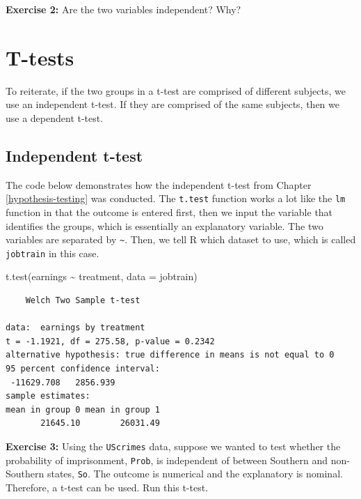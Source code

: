 \documentclass[
]{book}
\makeatletter
\newenvironment{Shaded}{\begin{snugshade}}{\end{snugshade}}
\newcommand{\AttributeTok}[1]{\textcolor[rgb]{0.61,0.61,0.61}{#1}}
\newcommand{\FunctionTok}[1]{\textcolor[rgb]{0,0,0}{#1}}
\newcommand{\NormalTok}[1]{#1}
\newcommand{\SpecialCharTok}[1]{\textcolor[rgb]{0,0,0}{#1}}
\newenvironment{kframe}{%
\medskip{}
\setlength{\fboxsep}{.8em}
 \def\at@end@of@kframe{}%
 \ifinner\ifhmode%
  \def\at@end@of@kframe{\end{minipage}}%
  \begin{minipage}{\columnwidth}%
 \fi\fi%
 \def\FrameCommand##1{\hskip\@totalleftmargin \hskip-\fboxsep
 \colorbox{shadecolor}{##1}\hskip-\fboxsep
     \hskip-\linewidth \hskip-\@totalleftmargin \hskip\columnwidth}%
 \MakeFramed {\advance\hsize-\width
   \@totalleftmargin\z@ \linewidth\hsize
   \@setminipage}}%
 {\par\unskip\endMakeFramed%
 \at@end@of@kframe}
\renewenvironment{Shaded}{\begin{kframe}}{\end{kframe}}
\newenvironment{rmdblock}[1]
  {\begin{shaded*}
  }
  {\end{shaded*}
  }
\newenvironment{learncheck}
  {\begin{rmdblock}{warning}}
  {\end{rmdblock}}
\makeatother
\begin{document}
\begin{learncheck}
\textbf{Exercise 2:} Are the two variables independent? Why?
\end{learncheck}

\hypertarget{t-tests}{%
\section{T-tests}\label{t-tests}}

To reiterate, if the two groups in a t-test are comprised of different subjects, we use an independent t-test. If they are comprised of the same subjects, then we use a dependent t-test.

\hypertarget{independent-t-test}{%
\subsection{Independent t-test}\label{independent-t-test}}

The code below demonstrates how the independent t-test from Chapter \ref{hypothesis-testing} was conducted. The \texttt{t.test} function works a lot like the \texttt{lm} function in that the outcome is entered first, then we input the variable that identifies the groups, which is essentially an explanatory variable. The two variables are separated by \texttt{\textasciitilde{}}. Then, we tell R which dataset to use, which is called \texttt{jobtrain} in this case.

\begin{Shaded}
\begin{Highlighting}[]
\FunctionTok{t.test}\NormalTok{(earnings }\SpecialCharTok{\textasciitilde{}}\NormalTok{ treatment, }\AttributeTok{data =}\NormalTok{ jobtrain)}
\end{Highlighting}
\end{Shaded}

\begin{verbatim}
	Welch Two Sample t-test

data:  earnings by treatment
t = -1.1921, df = 275.58, p-value = 0.2342
alternative hypothesis: true difference in means is not equal to 0
95 percent confidence interval:
 -11629.708   2856.939
sample estimates:
mean in group 0 mean in group 1 
       21645.10        26031.49 
\end{verbatim}

\begin{learncheck}
\textbf{Exercise 3:} Using the \texttt{UScrimes} data, suppose we wanted
to test whether the probability of imprisonment, \texttt{Prob}, is
independent of between Southern and non-Southern states, \texttt{So}.
The outcome is numerical and the explanatory is nominal. Therefore, a
t-test can be used. Run this t-test.
\end{learncheck}
\end{document}
